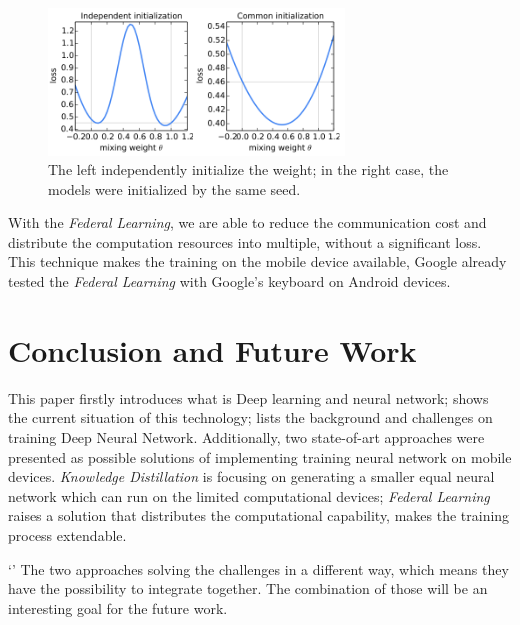 \documentclass[article]{aaltoseries}
\begin{document}
\begin{figure}[t!]
  \begin{center}
    \includegraphics[width=0.7\textwidth]{figures/share_weight}
    \caption{The left independently initialize the weight; in the right case, the models were initialized by the same seed.}
    \label{fig:share_weight}
  \end{center}
\end{figure}

With the \emph{Federal Learning}, we are able to reduce the communication cost and distribute the computation resources into multiple,
without a significant loss.
This technique makes the training on the mobile device available, Google already tested the \emph{Federal Learning} with Google's keyboard
on Android devices\cite{BrendanMcMahanandDanielRamage2017}.







\section{Conclusion and Future Work}
\label{sec:conclusion}

This paper firstly introduces what is Deep learning and neural network; shows the current situation of this technology;
lists the background and challenges on training Deep Neural Network. Additionally, two state-of-art approaches were 
presented as possible solutions of implementing training neural network on mobile devices. \emph{Knowledge Distillation} 
is focusing on generating a smaller equal neural network which can run on the limited computational devices; 
\emph{Federal Learning} raises a solution that distributes the computational capability, makes the training process
extendable. 

`'
The two approaches solving the challenges in a different way, which means they have the possibility to integrate together. 
The combination of those will be an interesting goal for the future work. 







\end{document}
